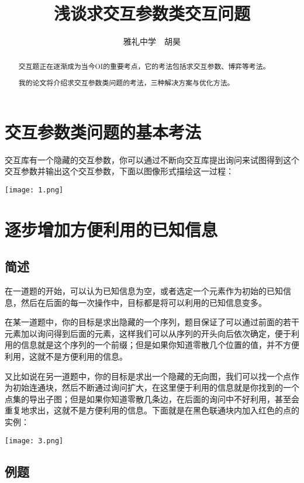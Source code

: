 \documentclass{noithesis}
\begin{document}

\title{浅谈求交互参数类交互问题}
\author{雅礼中学~~胡昊}

\maketitle

\begin{abstract}
交互题正在逐渐成为当今OI的重要考点，它的考法包括求交互参数、博弈等考法。

我的论文将介绍求交互参数类问题的考法，三种解决方案与优化方法。
\end{abstract}

\section{交互参数类问题的基本考法}

交互库有一个隐藏的交互参数，你可以通过不断向交互库提出询问来试图得到这个交互参数并输出这个交互参数，下面以图像形式描绘这一过程：

\texttt{[image: 1.png]}

\section{逐步增加方便利用的已知信息}

\subsection{简述}

在一道题的开始，可以认为已知信息为空，或者选定一个元素作为初始的已知信息，然后在后面的每一次操作中，目标都是将可以利用的已知信息变多。

在某一道题中，你的目标是求出隐藏的一个序列，题目保证了可以通过前面的若干元素加以询问得到后面的元素，这样我们可以从序列的开头向后依次确定，便于利用的信息就是这个序列的一个前缀；但是如果你知道零散几个位置的值，并不方便利用，这就不是方便利用的信息。

又比如说在另一道题中，你的目标是求出一个隐藏的无向图，我们可以找一个点作为初始连通块，然后不断通过询问扩大，在这里便于利用的信息就是你找到的一个点集的导出子图；但是如果你知道零散几条边，在后面的询问中不好利用，甚至会重复地求出，这就不是方便利用的信息。下面就是在黑色联通块内加入红色的点的实例：

\texttt{[image: 3.png]}

\subsection{例题}
\end{document}
